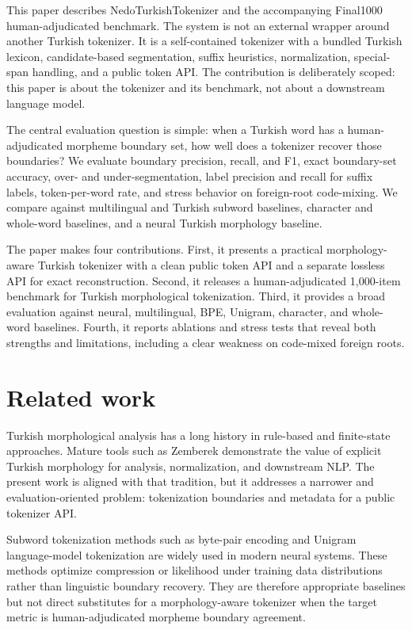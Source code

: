 \documentclass[11pt]{article}
\begin{document}
This paper describes NedoTurkishTokenizer and the accompanying Final1000 human-adjudicated benchmark. The system is not an external wrapper around another Turkish tokenizer. It is a self-contained tokenizer with a bundled Turkish lexicon, candidate-based segmentation, suffix heuristics, normalization, special-span handling, and a public token API. The contribution is deliberately scoped: this paper is about the tokenizer and its benchmark, not about a downstream language model.

The central evaluation question is simple: when a Turkish word has a human-adjudicated morpheme boundary set, how well does a tokenizer recover those boundaries? We evaluate boundary precision, recall, and F1, exact boundary-set accuracy, over- and under-segmentation, label precision and recall for suffix labels, token-per-word rate, and stress behavior on foreign-root code-mixing. We compare against multilingual and Turkish subword baselines, character and whole-word baselines, and a neural Turkish morphology baseline.

The paper makes four contributions. First, it presents a practical morphology-aware Turkish tokenizer with a clean public token API and a separate lossless API for exact reconstruction. Second, it releases a human-adjudicated 1,000-item benchmark for Turkish morphological tokenization. Third, it provides a broad evaluation against neural, multilingual, BPE, Unigram, character, and whole-word baselines. Fourth, it reports ablations and stress tests that reveal both strengths and limitations, including a clear weakness on code-mixed foreign roots.

\section{Related work}
Turkish morphological analysis has a long history in rule-based and finite-state approaches. Mature tools such as Zemberek demonstrate the value of explicit Turkish morphology for analysis, normalization, and downstream NLP. The present work is aligned with that tradition, but it addresses a narrower and evaluation-oriented problem: tokenization boundaries and metadata for a public tokenizer API.

Subword tokenization methods such as byte-pair encoding and Unigram language-model tokenization are widely used in modern neural systems. These methods optimize compression or likelihood under training data distributions rather than linguistic boundary recovery. They are therefore appropriate baselines but not direct substitutes for a morphology-aware tokenizer when the target metric is human-adjudicated morpheme boundary agreement.
\end{document}
